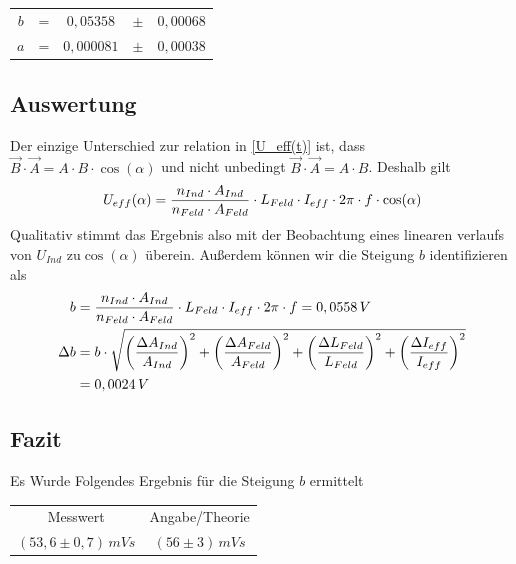 \documentclass{article}
\begin{document}
\begin{center}
\begin{tabular}{c c c c c} 
  \(b\) & = & \(0,05358\) & \(\pm \) & \(0,00068 \) \\ 
  \(a\) & = & \(0,000081\) & \(\pm \) & \(0,00038 \) \\ 

 \end{tabular}
\end{center}

\subsection{Auswertung}
Der einzige Unterschied zur relation in \eqref{U_eff(t)} ist, dass \(\vec{B} \cdot \vec{A} = A \cdot B \cdot \cos(\alpha) \) und nicht unbedingt \(\vec{B} \cdot \vec{A} = A \cdot B \). Deshalb gilt
\begin{equation}
U_{eff}(\alpha) = \frac{n_{Ind} \cdot A_{Ind}}{n_{Feld} \cdot A_{Feld}} \cdot L_{Feld} \cdot I_{eff} \cdot 2\pi \cdot f \cdot \cos(\alpha)
\notag
\end{equation}
Qualitativ stimmt das Ergebnis also mit der Beobachtung eines linearen verlaufs von \( U_{Ind} \) zu\( \cos(\alpha) \) überein. Außerdem können wir die Steigung \(b\) identifizieren als
\begin{align}
b &= \frac{n_{Ind} \cdot A_{Ind}}{n_{Feld} \cdot A_{Feld}} \cdot L_{Feld} \cdot I_{eff} \cdot 2\pi \cdot f
= 0,0558 \,V
\notag
\\
\Delta b &= b \cdot \sqrt{
\left( \frac{\Delta A_{Ind}}{A_{Ind}} \right)^2 +
\left( \frac{\Delta A_{Feld}}{A_{Feld}} \right)^2 +
\left( \frac{\Delta L_{Feld}}{L_{Feld}} \right)^2 +
\left( \frac{\Delta I_{eff}}{I_{eff}} \right)^2
}
\notag
\\
&= 0,0024 \, V
\end{align}

\subsection{Fazit}
Es Wurde Folgendes Ergebnis für die Steigung \(b\) ermittelt
\begin{center}
\begin{tabular}{c c} 
 Messwert & Angabe/Theorie \\
 \( (53,6 \pm 0,7)\, mVs \) & \( (56 \pm 3)\, mVs \) \\
 \end{tabular}
\end{center}
\end{document}
